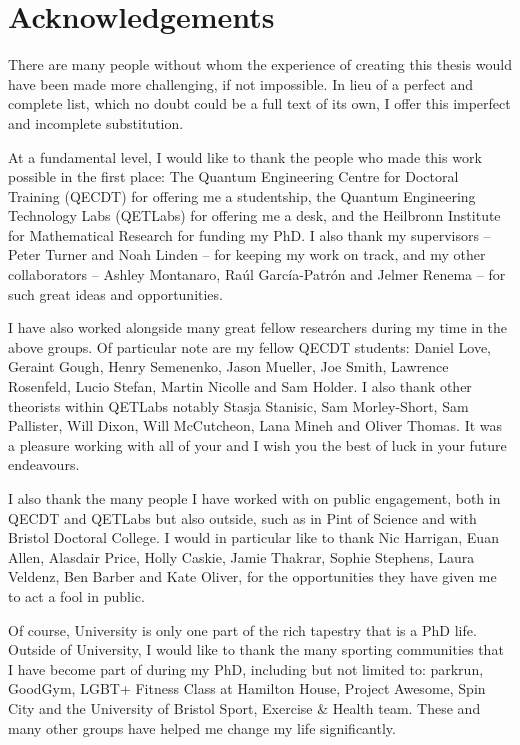 \chapter*{Acknowledgements}

There are many people without whom the experience of creating this thesis would have been made more challenging, if not impossible. In lieu of a perfect and complete list, which no doubt could be a full text of its own, I offer this imperfect and incomplete substitution.

At a fundamental level, I would like to thank the people who made this work possible in the first place: The Quantum Engineering Centre for Doctoral Training (QECDT) for offering me a studentship, the Quantum Engineering Technology Labs (QETLabs) for offering me a desk, and the Heilbronn Institute for Mathematical Research for funding my PhD. I also thank my supervisors -- Peter Turner and Noah Linden -- for keeping my work on track, and my other collaborators -- Ashley Montanaro, Ra\'{u}l Garc\'{i}a-Patr\'{o}n and Jelmer Renema -- for such great ideas and opportunities.

I have also worked alongside many great fellow researchers during my time in the above groups. Of particular note are my fellow QECDT students: Daniel Love, Geraint Gough, Henry Semenenko, Jason Mueller, Joe Smith, Lawrence Rosenfeld, Lucio Stefan, Martin Nicolle and Sam Holder. I also thank other theorists within QETLabs notably Stasja Stanisic, Sam Morley-Short, Sam Pallister, Will Dixon, Will McCutcheon, Lana Mineh and Oliver Thomas. It was a pleasure working with all of your and I wish you the best of luck in your future endeavours.

I also thank the many people I have worked with on public engagement, both in QECDT and QETLabs but also outside, such as in Pint of Science and with Bristol Doctoral College. I would in particular like to thank Nic Harrigan, Euan Allen, Alasdair Price, Holly Caskie, Jamie Thakrar, Sophie Stephens, Laura Veldenz, Ben Barber and Kate Oliver, for the opportunities they have given me to act a fool in public.

Of course, University is only one part of the rich tapestry that is a PhD life. Outside of University, I would like to thank the many sporting communities that I have become part of during my PhD, including but not limited to: parkrun, GoodGym, LGBT+ Fitness Class at Hamilton House, Project Awesome, Spin City and the University of Bristol Sport, Exercise \& Health team. These and many other groups have helped me change my life significantly.

